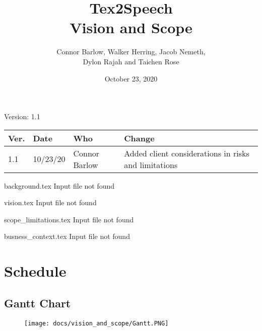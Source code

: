 \documentclass[letterpaper,12pt]{article}
\title{Tex2Speech\\Vision and Scope}
\author{Connor Barlow, Walker Herring, Jacob Nemeth,\\Dylon Rajah and Taichen Rose}
\date{October 23, 2020}
\begin{document}
\maketitle

\begin{center}
  Version: 1.1
\end{center}

\vfill
\begin{tabularx}{\linewidth}{|l|l|l|X|}\hline
Ver. & Date & Who & Change\\\hline
1.1  & 10/23/20  & Connor Barlow  & Added client considerations in risks and limitations\\\hline
\end{tabularx}
\newpage

background.tex Input file not found 

vision.tex Input file not found 

scope_limitations.tex Input file not found 

busness_context.tex Input file not found 

\section{Schedule}

\subsection{Gantt Chart}
\begin{figure}[h]
\texttt{[image: docs/vision\_and\_scope/Gantt.PNG]}
\end{figure}
\end{document}
